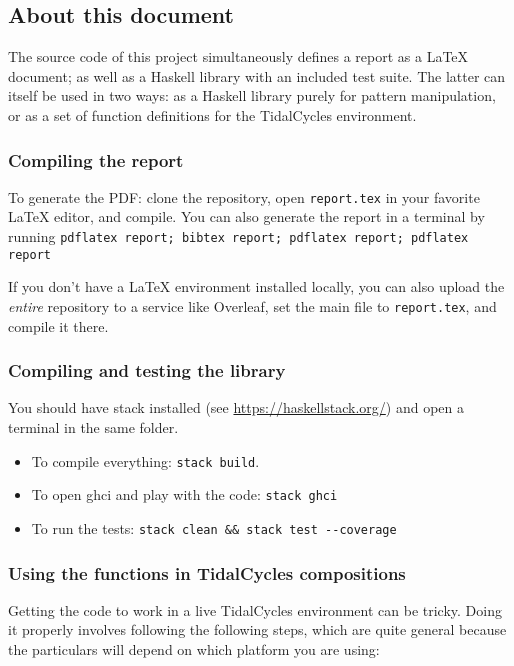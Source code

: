 \subsection{About this document}

The source code of this project simultaneously defines
a report as a \LaTeX{} document;
as well as a Haskell library with an included test suite.
The latter can itself be used in two ways:
as a Haskell library purely for pattern manipulation,
or as a set of function definitions for the TidalCycles environment.

\subsubsection*{Compiling the report}

To generate the PDF: clone the repository, open \texttt{report.tex} in your favorite \LaTeX{} editor, and compile.
You can also generate the report in a terminal by running
\texttt{pdflatex report; bibtex report; pdflatex report; pdflatex report}

If you don't have a \LaTeX{} environment installed locally, you can also upload the \emph{entire} repository to a service like Overleaf, set the main file to \texttt{report.tex}, and compile it there.

\subsubsection*{Compiling and testing the library}

You should have stack installed (see \url{https://haskellstack.org/}) and
open a terminal in the same folder.

\begin{itemize}
  \item To compile everything: \verb|stack build|.
  \item To open ghci and play with the code: \verb|stack ghci|
  \item To run the tests: \verb|stack clean && stack test --coverage|
\end{itemize}

\subsubsection*{Using the functions in TidalCycles compositions}

Getting the code to work in a live TidalCycles environment can be tricky.
Doing it properly involves following the following steps, which are quite general because the particulars will depend on which platform you are using:

